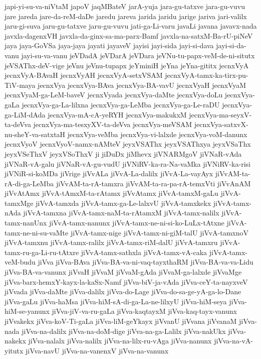 {japi-yi-su-va-niVtaM
japoV
jaqMBateV
jarA-yuja
jara-gu-tatxve
jara-gu-vuvu
jare
jareda
jare-da-reM-daDe
jaredu
jareva
jarida
jaridu
jarige
jariva
jari-valilx
jaru-gi-suva
jaru-gu-tatxve
jaru-gu-vuvu
jati-ga-Li-varu
javaLi
javana
javavx-nada
javxla-dagenxVH
javxla-da-ginx-sa-ma-parx-Bamf
javxla-na-satxM-Ba-rU-piNeV
jaya
jaya-GoVSa
jaya-jaya
jayati
jayaveV
jayisi
jayi-sida
jayi-si-dava
jayi-si-da-vanu
jayi-su-va-vanu
jeVDadA
jeVDarA
jeVDara
jeVNu-tu-papx-veM-de-ni-situtx
jeVSAThx-deV-vige
jeVnu
jeVnu-tupapx
jeYminiH
jeYna
jeYna-gititx
jecnxVyA
jecnxVyA-BAvaH
jecnxVyAH
jecnxVyA-setxVSAM
jecnxVyA-tamx-ka-tirx-pu-TiV-maya
jecnxVya
jecnxVya-BAva
jecnxVya-BA-vavU
jecnxVyaH
jecnxVyaM
jecnxVyaM-ga-LeM-baveV
jecnxVyada
jecnxVya-daMte
jecnxVya-doLu
jecnxVya-gaLa
jecnxVya-ga-La-lilxna
jecnxVya-ga-LeMba
jecnxVya-ga-Le-raDU
jecnxVya-ga-LiM-dAda
jecnxVya-mA-cA-yeRYH
jecnxVya-makukxM
jecnxVya-ma-seyxV-ta-deVva
jecnxVya-ma-tesxyXV-ta-deVva
jecnxVya-meVSAM
jecnxVya-satxvX-nu-sheY-va-satxtaH
jecnxVya-veMba
jecnxVya-vi-lalxde
jecnxVya-voM-danunx
jecnxVyoV
jecnxVyoV-namx-nAMteV
jeyxVSAThx
jeyxVSAThxya
jeyxVSaThx
jeyxVSeThxV
jeyxVSoThxV
ji
jiDuDx
jiMhevx
jiVNARMgoV
jiVNaR-vAda
jiVNaR-vA-galu
jiVNaR-vA-gu-vudU
jiVNiRV-ka-ra-Na-vaMka
jiVNiRV-ka-risi
jiVNiR-si-koMDa
jiVrige
jiVvALa
jiVvA-La-dalilx
jiVvA-La-vayAyx
jiVvAM-ta-rA-di-ga-LeMba
jiVvAM-ta-rA-tamxra
jiVvAM-ta-ra-pa-rA-temxVti
jiVvAnAM
jiVvAtAmx
jiVvA-tAmxM-ta-rAtamx
jiVvAtamx
jiVvA-tamxM-gaLu
jiVvA-tamxMge
jiVvA-tamxda
jiVvA-tamx-ga-Le-lalxvU
jiVvA-tamxkekx
jiVvA-tamx-nAda
jiVvA-tamxna
jiVvA-tamx-naM-ta-rAtamxM
jiVvA-tamx-nalilx
jiVvA-tamx-nanUnx
jiVvA-tamx-nanunx
jiVvA-tamx-ne-ni-si-ko-LuLx-tAtxne
jiVvA-tamx-ne-ni-su-vaMte
jiVvA-tamx-nige
jiVvA-tamx-ni-giM-talU
jiVvA-tamxnoV
jiVvA-tamxnu
jiVvA-tamx-ralilx
jiVvA-tamx-riM-dalU
jiVvA-tamxru
jiVvA-tamx-ru-ga-Li-ru-tAtxre
jiVvA-tamx-sathxla
jiVvA-tamx-vA-caka
jiVvA-tamx-veM-budu
jiVva
jiVva-BAva
jiVva-BA-va-ni-vaq-tayxthaRM
jiVva-BA-va-va-Lidu
jiVva-BA-va-vanunx
jiVvaH
jiVvaM
jiVvaM-gAda
jiVvaM-ga-lalxde
jiVvaMge
jiVva-barx-hemxY-kayx-la-kaSx-Namf
jiVva-biV-ja-vAda
jiVva-ceY-ta-nayxveV
jiVvada
jiVva-daMte
jiVva-dalilx
jiVva-do-Lage
jiVva-do-sa-ge-yA-ga-lo-Dane
jiVva-gaLu
jiVva-haMsa
jiVva-hiM-sA-di-ga-La-ne-lilxyU
jiVva-hiM-seya
jiVva-hiM-se-yanunx
jiVva-jiV-va-ru-gaLa
jiVva-kaqtayxM
jiVva-kaq-tayx-vanunx
jiVvakekx
jiVva-koV-Ti-gaLa
jiVva-liM-geYkayx
jiVvanU
jiVvana
jiVvanaM
jiVva-nada
jiVva-na-dalilx
jiVva-na-doM-dige
jiVva-na-ga-Lalilx
jiVva-nakUkx
jiVva-nakekx
jiVva-nalalx
jiVva-nalilx
jiVva-na-lilx-ru-vAga
jiVva-nanunx
jiVva-na-vA-yitutx
jiVva-navU
jiVva-na-vanenxV
jiVva-na-vanunx
}
